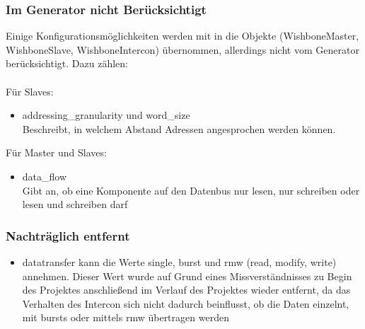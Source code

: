 \documentclass{article}
\begin{document}
\subsubsection{Im Generator nicht Berücksichtigt}
Einige Konfigurationsmöglichkeiten werden mit in die Objekte (WishboneMaster, WishboneSlave, WishboneIntercon) übernommen, allerdings nicht vom Generator berücksichtigt. Dazu zählen:\\\\
Für Slaves:
\begin{itemize}
\item addressing\_granularity und word\_size\\
Beschreibt, in welchem Abstand Adressen angesprochen werden können.\\
\noindent
{}
\end{itemize}
Für Master und Slaves:
\begin{itemize}
\item data\_flow\\
Gibt an, ob eine Komponente auf den Datenbus nur lesen, nur schreiben oder lesen und schreiben darf
\end{itemize}
\subsubsection{Nachträglich entfernt}
\begin{itemize}
\item datatransfer
kann die Werte single, burst und rmw (read, modify, write) annehmen. Dieser Wert wurde auf Grund eines Missverständnisses zu Begin des Projektes anschließend im Verlauf des Projektes wieder entfernt, da das Verhalten des Intercon sich nicht dadurch beinflusst, ob die Daten einzelnt, mit bursts oder mittels rmw übertragen werden
\end{itemize}
\end{document}
